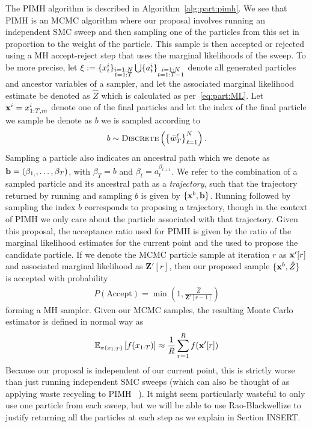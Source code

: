 The PIMH algorithm is described in Algorithm~\ref{alg:part:pimh}.  We see that PIMH is an MCMC
algorithm where our proposal involves running an independent SMC
sweep and then sampling one of the particles from this set in proportion to
the weight of the particle.
  This sample is then accepted or rejected using a MH accept-reject
step that  uses the marginal likelihoods of the sweep.  
To be more precise, let $\mathbf{\xi} := \{x_{t}^i\}_{\substack{i=1:N\\t=1:T}} \bigcup \{a_{t}^i\}_{\substack{i=1:N\\t=1:T-1}}$
denote all generated particles and ancestor variables of a \smc sampler, and let the associated
marginal likelihood estimate be denoted as $\hat{Z}$ which is calculated as per~\eqref{eq:part:ML}.
Let $\mathbf{x}^i = x_{1:T,m}^i$ denote one of the final particles and let the index of the final
particle we sample be denote as $b$ we is sampled according to
\begin{align}
\label{eq:part:b}
b \sim \operatorname*{\textsc{Discrete}}\left(\left\{\bar w_{T}^\ell\right\}_{\ell=1}^N\right).
\end{align}
Sampling a particle also indicates an ancestral path
which we denote as $\mathbf{b} = (\beta_{1,},\ldots,\beta_{T})$, with
$\beta_{T} = b$ and $\beta_{t} = a_{t}^{\beta_{t+1}}$.  We refer to the combination of a sampled
particle and its ancestral path as a \emph{trajectory}, such that the trajectory returned by running \smc
and sampling $b$ is given by $\{\mathbf{x}^{b},\mathbf{b}\}$.  Running \smc followed by sampling the index $b$
corresponds to proposing a trajectory, though in the context of PIMH we only care about the particle
associated with that trajectory.  Given this proposal, the acceptance ratio used for PIMH is
given by the ratio of the marginal likelihood estimates for the current point and the \smc used
to propose the candidate particle.  If we denote the MCMC particle sample at iteration $r$ as $\mathbf{x}'[r]$ and
associated marginal likelihood as $\mathbf{Z}'[r]$, then our proposed sample $\{\mathbf{x}^b,\hat{Z}\}$ 
is accepted with probability
\begin{align}
\label{eq:part:pimh-acc}
P(\text{Accept}) = \min \left(1,\frac{\hat{Z}}{\mathbf{Z}'[r-1]}\right)
\end{align}
forming a MH sampler.
Given our MCMC samples, the resulting Monte Carlo estimator is defined in normal way as
\begin{align}
\label{eq:part:pimh-est}
\mathbb{E}_{\pi (x_{1:T})} \left[f(x_{1:T})\right] \approx \frac{1}{R} \sum_{r=1}^{R} f(\mathbf{x}'[r])
\end{align}
Because our proposal
is independent of our current point, this is strictly worse than just running independent SMC sweeps
(which can also be thought of as applying waste recycling to PIMH ~\citep{frenkel2006waste}).  
It might seem particularly wasteful to only use
one particle from each sweep, but we will be able to use Rao-Blackwellize to justify
returning all the particles at each step as we explain in Section INSERT. 


